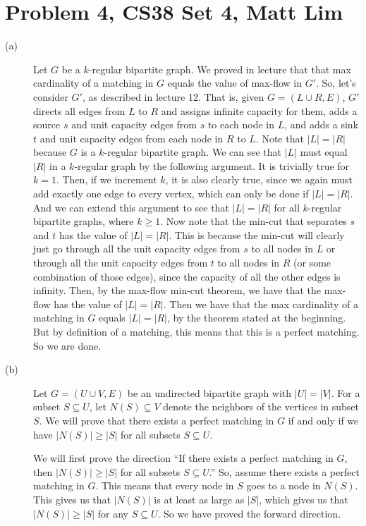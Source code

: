 \documentclass{article}
\begin{document}
\section*{Problem 4, CS38 Set 4, Matt Lim}
\begin{description}
    \item[(a)]Let $G$ be a $k$-regular bipartite graph.
        We proved in lecture that that max cardinality of a matching in $G$ equals the
        value of max-flow in $G'$. So, let's consider $G'$, as described in lecture 12.
        That is, given $G = (L \cup R, E)$, $G'$ directs all edges from $L$ to $R$ and
        assigns infinite capacity for them, adds a source $s$ and unit
        capacity edges from $s$ to each node in $L$, and adds a sink $t$ and unit
        capacity edges from each node in $R$ to $L$.
        Note that $|L| = |R|$ because $G$ is a $k$-regular bipartite graph.
        We can see that $|L|$ must equal
        $|R|$ in a $k$-regular graph by the following argument. It is trivially true for
        $k=1$. Then, if we increment $k$, it is also clearly true, since we again must
        add exactly one edge to every vertex, which can only be done if $|L| = |R|$. And
        we can extend this argument to see that $|L| = |R|$ for all $k$-regular
        bipartite graphs, where $k \ge 1$.  Now note that the min-cut that
        separates $s$ and $t$ has the value of $|L| = |R|$.
        This is because the min-cut will clearly just go through all the unit
        capacity edges from $s$ to all nodes in $L$ or through all the unit
        capacity edges from $t$ to all nodes in $R$ (or some combination of
        those edges), since the capacity of all the other edges is infinity.
        Then, by the max-flow min-cut theorem, we have that the max-flow
        has the value of $|L| = |R|$.  Then we have that the max cardinality of a matching
        in $G$ equals $|L| = |R|$, by the theorem stated at the beginning. But by definition of a
        matching, this means that this is a perfect matching. So we are done.
    \item[(b)] Let $G = (U \cup V, E)$ be an undirected bipartite graph with $|U|
        = |V|$. For a subset $S \subseteq U$, let $N(S) \subseteq V$ denote the
        neighbors of the vertices in subset $S$. We will prove that there exists
        a perfect matching in $G$ if and only if we have $|N(S)| \ge |S|$ for
        all subsets $S \subseteq U$.

        We will first prove the direction ``If there exists a perfect matching
        in $G$, then $|N(S)| \ge |S|$ for all subsets $S \subseteq U$.'' So,
        assume there exists a perfect matching in $G$. This means that every
        node in $S$ goes to a node in $N(S)$. This gives us that $|N(S)|$ is at
        least as large as $|S|$, which gives us that $|N(S)| \ge |S|$ for any
        $S \subseteq U$. So we have proved the forward direction.


\end{description}
\end{document}
